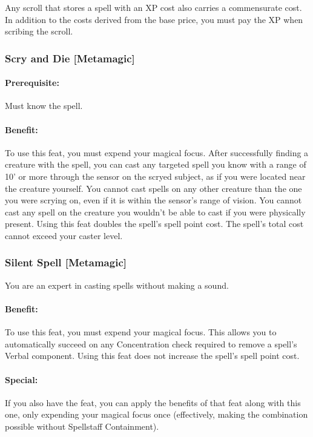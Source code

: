 Any scroll that stores a spell with an XP cost also carries a commensurate cost. 
In addition to the costs derived from the base price, you must pay the XP when scribing the scroll.
\subsubsection[Scry and Die]{Scry and Die [Metamagic]}
\label{Feat:ScryAndDie}
\paragraph{Prerequisite:} 
Must know the  spell.

\paragraph{Benefit:} To use this feat, you must expend your magical focus. 
After successfully finding a creature with the  spell, 
you can cast any targeted spell you know with a range of 10' or more through the sensor
on the scryed subject, as if you were located near the creature yourself.
You cannot cast spells on any other creature than the one you were scrying on, 
even if it is within the sensor's range of vision. You cannot cast any spell
on the creature you wouldn't be able to cast if you were physically present.
Using this feat doubles the spell's spell point cost.
The spell's total cost cannot exceed your caster level.
\subsubsection[Silent Spell]{Silent Spell [Metamagic]}
\label{Feat:SilentSpell}
You are an expert in casting spells without making a sound.

\paragraph{Benefit:} To use this feat, you must expend your magical focus.
This allows you to automatically succeed on any Concentration check required to remove a spell's Verbal component.
Using this feat does not increase the spell's spell point cost.

\paragraph{Special:} If you also have the  feat, you can apply the benefits of that feat along with this one, only expending your magical focus once 
(effectively, making the combination possible without Spellstaff Containment).
